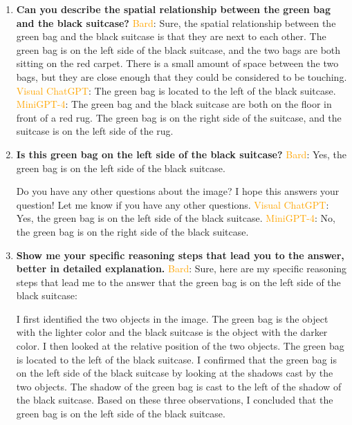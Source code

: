     \begin{enumerate}
        \item \textbf{Can you describe the spatial relationship between the green bag and the black suitcase?}
        \subitem \textcolor{orange}{Bard}: 
        Sure, the spatial relationship between the green bag and the black suitcase is that they are next to each other. The green bag is on the left side of the black suitcase, and the two bags are both sitting on the red carpet. There is a small amount of space between the two bags, but they are close enough that they could be considered to be touching.
        \subitem \textcolor{orange}{Visual ChatGPT}: The green bag is located to the left of the black suitcase.
        \subitem \textcolor{orange}{MiniGPT-4}: The green bag and the black suitcase are both on the floor in front of a red rug. The green bag is on the right side of the suitcase, and the suitcase is on the left side of the rug.
        \item \textbf{Is this green bag on the left side of the black suitcase?}
        \subitem \textcolor{orange}{Bard}: Yes, the green bag is on the left side of the black suitcase.

        Do you have any other questions about the image?
        I hope this answers your question! Let me know if you have any other questions.
        \subitem \textcolor{orange}{Visual ChatGPT}: Yes, the green bag is on the left side of the black suitcase.
        \subitem \textcolor{orange}{MiniGPT-4}: No, the green bag is on the right side of the black suitcase.
        \item \textbf{Show me your specific reasoning steps that lead you to the answer, better in detailed explanation.}
        \subitem \textcolor{orange}{Bard}: 
        Sure, here are my specific reasoning steps that lead me to the answer that the green bag is on the left side of the black suitcase:
        
        I first identified the two objects in the image. The green bag is the object with the lighter color and the black suitcase is the object with the darker color.
        I then looked at the relative position of the two objects. The green bag is located to the left of the black suitcase.
        I confirmed that the green bag is on the left side of the black suitcase by looking at the shadows cast by the two objects. The shadow of the green bag is cast to the left of the shadow of the black suitcase.
        Based on these three observations, I concluded that the green bag is on the left side of the black suitcase.
        

\end{enumerate}

